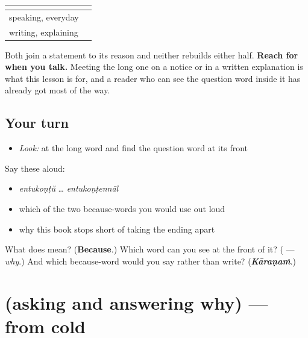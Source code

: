 \begin{grammarlens}[title={Grammar Lens: which one to use}]
\noindent
\begin{tabularx}{\linewidth}{@{}>{\raggedright\arraybackslash}X>{\raggedright\arraybackslash}X@{}}
\toprule
\textbf{} & \textbf{} \\
\midrule
speaking, everyday & \textbf{\ml{കാരണം}} \\
writing, explaining & \textbf{\ml{എന്തുകൊണ്ടെന്നാൽ}} \\
\bottomrule
\end{tabularx}

Both join a statement to its reason and neither rebuilds either half. \textbf{Reach for  when you talk.} Meeting the long one on a notice or in a written explanation is what this lesson is for, and a reader who can see the question word inside it has already got most of the way.
\end{grammarlens}

\subsection*{Your turn}
\begin{itemize}
\raggedright
  \item \emph{Look:} at the long word and find the question word at its front
\end{itemize}

\begin{quote}
\end{quote}

Say these aloud:

\begin{itemize}
\raggedright
  \item \emph{entukoṇṭŭ} … \emph{entukoṇṭennāl}
  \item which of the two because-words you would use out loud
  \item why this book stops short of taking the ending apart
\end{itemize}

\begin{tcolorbox}[breakable,colback=teal!4,colframe=teal!35!black,title={Before you move on}]
What does \textbf{} mean? (\textbf{Because}.) Which word can you see at the front of it? (\textbf{} — \emph{why}.) And which because-word would you say rather than write? (\emph{\textbf{Kāraṇaṁ}}.)
\end{tcolorbox}
\section[(asking and answering why)]{(asking and answering why) — from cold}

